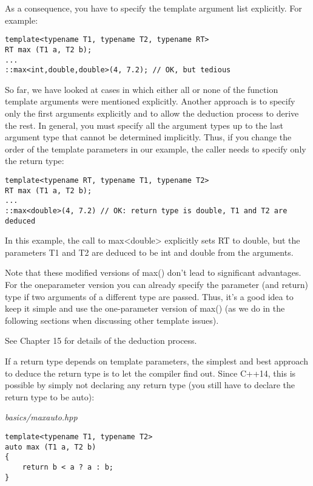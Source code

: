 As a consequence, you have to specify the template argument list explicitly. For example:

\begin{lstlisting}[style=styleCXX]
template<typename T1, typename T2, typename RT>
RT max (T1 a, T2 b);
...
::max<int,double,double>(4, 7.2); // OK, but tedious
\end{lstlisting}

So far, we have looked at cases in which either all or none of the function template arguments were mentioned explicitly. Another approach is to specify only the first arguments explicitly and to allow the deduction process to derive the rest. In general, you must specify all the argument types up to the last argument type that cannot be determined implicitly. Thus, if you change the order of the template parameters in our example, the caller needs to specify only the return type:

\begin{lstlisting}[style=styleCXX]
template<typename RT, typename T1, typename T2>
RT max (T1 a, T2 b);
...
::max<double>(4, 7.2) // OK: return type is double, T1 and T2 are deduced
\end{lstlisting}

In this example, the call to max<double> explicitly sets RT to double, but the parameters T1 and T2 are deduced to be int and double from the arguments. 

Note that these modified versions of max() don’t lead to significant advantages. For the oneparameter version you can already specify the parameter (and return) type if two arguments of a different type are passed. Thus, it’s a good idea to keep it simple and use the one-parameter version of max() (as we do in the following sections when discussing other template issues).

See Chapter 15 for details of the deduction process.


If a return type depends on template parameters, the simplest and best approach to deduce the return type is to let the compiler find out. Since C++14, this is possible by simply not declaring any return type (you still have to declare the return type to be auto):

\noindent
\textit{basics/maxauto.hpp}
\begin{lstlisting}[style=styleCXX]
template<typename T1, typename T2>
auto max (T1 a, T2 b)
{
	return b < a ? a : b;
}
\end{lstlisting}

